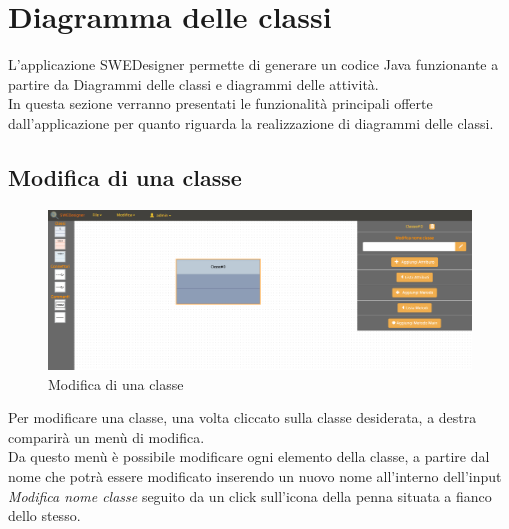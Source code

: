 \section{Diagramma delle classi}
L'applicazione SWEDesigner permette di generare un codice Java funzionante a partire da Diagrammi delle classi e diagrammi delle attività.\\
In questa sezione verranno presentati le funzionalità principali offerte dall'applicazione per quanto riguarda la realizzazione di diagrammi delle classi.
	\subsection{Modifica di una classe}
		\begin{figure}[h!]
			\centering
				\includegraphics[scale=0.22]{res/img/classe1.png}
			\caption{Modifica di una classe}
		\end{figure}
		Per modificare una classe, una volta cliccato sulla classe desiderata, a destra comparirà un menù di modifica.\\
		Da questo menù è possibile modificare ogni elemento della classe, a partire dal nome che potrà essere modificato inserendo
		un nuovo nome all'interno dell'input \emph{Modifica nome classe} seguito da un click sull'icona della penna situata a fianco dello stesso.\\
